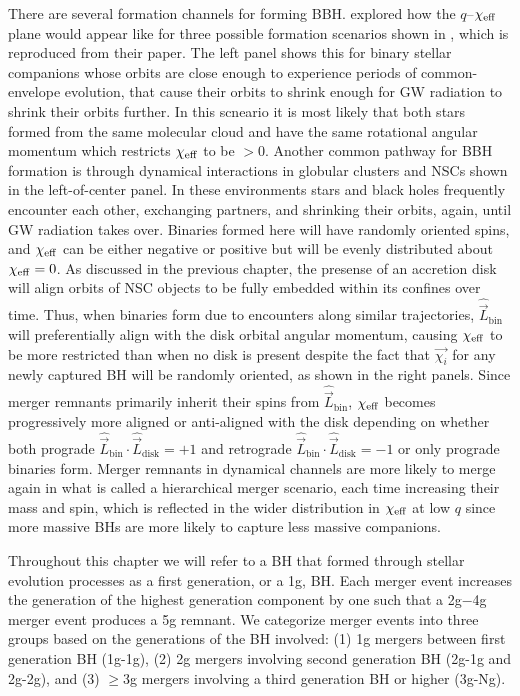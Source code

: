 There are several formation channels for forming BBH.
\citet{Santini+23} explored how the $q$--$\chi_{\rm eff}$ plane would appear like for three possible formation scenarios shown in , which is reproduced from their paper.
The left panel shows this for binary stellar companions whose orbits are close enough to experience periods of common-envelope evolution, that cause their orbits to shrink enough for GW radiation to shrink their orbits further.
In this scneario it is most likely that both stars formed from the same molecular cloud and have the same rotational angular momentum which restricts $\chi_{\rm eff}$ to be $>0$.
Another common pathway for BBH formation is through dynamical interactions in globular clusters and NSCs shown in the left-of-center panel.
In these environments stars and black holes frequently encounter each other, exchanging partners, and shrinking their orbits, again, until GW radiation takes over.
Binaries formed here will have randomly oriented spins, and $\chi_{\rm eff}$ can be either negative or positive but will be evenly distributed about $\chi_{\rm eff}=0$.
As discussed in the previous chapter, the presense of an accretion disk will align orbits of NSC objects to be fully embedded within its confines over time.
Thus, when binaries form due to encounters along similar trajectories, $\hat{\vec{L}}_\text{bin}$ will preferentially align with the disk orbital angular momentum, causing $\chi_{\rm eff}$ to be more restricted than when no disk is present despite the fact that $\vec{\chi_i}$ for any newly captured BH will be randomly oriented, as shown in the right panels.
Since merger remnants primarily inherit their spins from $\hat{\vec{L}}_\text{bin}$, $\chi_{\rm eff}$ becomes progressively more aligned or anti-aligned with the disk depending on whether both prograde $\hat{\vec{L}}_\text{bin} \cdot \hat{\vec{L}}_\text{disk} = +1$ and retrograde $\hat{\vec{L}}_\text{bin} \cdot \hat{\vec{L}}_\text{disk} = -1$ or only prograde binaries form.
Merger remnants in dynamical channels are more likely to merge again in what is called a hierarchical merger scenario, each time increasing their mass and spin, which is reflected in the wider distribution in $\chi_{\rm eff}$ at low $q$ since more massive BHs are more likely to capture less massive companions.


Throughout this chapter we will refer to a BH that formed through stellar evolution processes as a first generation, or a 1g, BH.
Each merger event increases the generation of the highest generation component by one such that a 2g$-$4g merger event produces a 5g remnant.
We categorize merger events into three groups based on the generations of the BH involved: (1) 1g mergers between first generation BH (1g-1g), (2) 2g mergers involving second generation BH (2g-1g and 2g-2g), and (3) $\geq$3g mergers involving a third generation BH or higher (3g-Ng).

